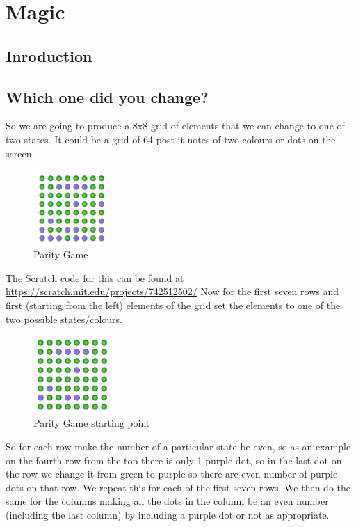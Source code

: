 \chapter{Magic}
\section{Inroduction}
\section{Which one did you change?}
So we are going to produce a 8x8 grid of elements that we can change to one of two states. It could be a grid of 64 post-it notes of two colours or dots on the screen.
\begin{figure}
    \centering
    \includegraphics[width=3cm]{chapters/chapterCT1/figures/paritygame.png}
    \caption{Parity Game}
    \label{fig:Parity Game in Scratch}
\end{figure}
\newline
The Scratch code for this can be found at \url{https://scratch.mit.edu/projects/742512502/}
\newline
Now for the first seven rows and first (starting from the left) elements of the grid set the elements to one of the two possible states/colours. 
\begin{figure}
    \centering
    \includegraphics[width=3cm]{chapters/chapterCT1/figures/paritygame2.png}
    \caption{Parity Game starting point}
    \label{fig:Parity Game starting point}
\end{figure}
\newline
So for each row make the number of a particular state be even, so as an example on the fourth row from the top there is only 1 purple dot, so in the last dot on the row we change it from green to purple so there are even number of purple dots on that row. We repeat this for each of the first seven rows. We then do the same for the columns making all the dots in the column be an even number (including the last column) by including a purple dot or not as appropriate.


